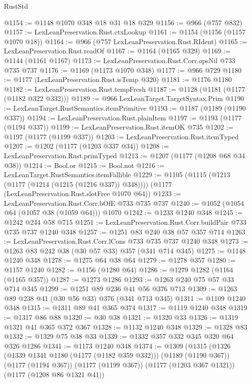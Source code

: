 \begin{lexlean}{RustStd}
\begin{coremodule}
{\begin{coremodule}
{{{{{@1154 := @1148 @1070 @348 @18 @31 @18 @329
@1156 := @966 (@757 @832)
@1157 := LexLeanPreservation.Rust.ctxLookup
@1161 := @1154 (@1156 (@1157 @1070 @18))
@1164 := @966 (@757 LexLeanPreservation.Rust.RIdent)
@1165 := LexLeanPreservation.Rust.readOf
@1167 := @1164 (@1165 @329)
@1169 := @1144 (@1161 @1167)
@1173 := LexLeanPreservation.Rust.Corr.opsNil @733 @735 @737
@1176 := @1169 (@1173 @1070 @348)
@1177 := @966 @729
@1180 := @1177 (LexLeanPreservation.Rust.isTemp @320)
@1181 := @1176 @1180
@1182 := LexLeanPreservation.Rust.tempFresh
@1187 := @1128 (@1181 (@1177 (@1182 @322 @332)))
@1189 := @966 LexLeanTarget.TargetSyntax.Prim
@1190 := LexLeanTarget.RustSemantics.itemPrimitive
@1193 := @1187 (@1189 (@1190 @337))
@1194 := LexLeanPreservation.Rust.plainItem
@1197 := @1193 (@1177 (@1194 @337))
@1199 := LexLeanPreservation.Rust.itemOK @735
@1202 := @1197 (@1177 (@1199 @337))
@1203 := LexLeanPreservation.Rust.itemTyped
@1207 := @1202 (@1177 (@1203 @337 @34))
@1208 := LexLeanPreservation.Rust.primTyped
@1213 := @1207 (@1177 (@1208 @68 @34 @38))
@1214 := Bool.or
@1215 := Bool.not
@1216 := LexLeanTarget.RustSemantics.itemFallible
@1229 := @1105
    (@1115 (@1213 (@1177 (@1214 (@1215 (@1216 @337)) @348))))
    (@1177 (LexLeanPreservation.Rust.slotFree @1070 @64))
@1233 := LexLeanPreservation.Rust.Corr.bOfE @733 @735 @737
@1240 := @1052 (@1054 @64 (@1057 @38 (@1059 @64))) @1070
@1242 := @1233 @1240 @348
@1245 := @1242 @244 @58 @715
@1251 := LexLeanPreservation.Rust.Corr.buildPair @733 @735 @737 @1240 @348
@1257 := @1251 @83 @240 @38 @57 @357 @714
@1263 := LexLeanPreservation.Rust.Corr.lCons @733 @735 @737 @1240 @348
@1273 := @1263 @83 @242 @38 (@30 @57 @33) @357 (@341 @714 @345)
@1275 := @1148 @1240 @348
@1278 := @1275 @64 @38 @64
@1279 := @1278 @357
@1280 := @1157 @1240
@1282 := @1156 (@1280 @64)
@1286 := @1279 @1282 (@1164 (@1165 @357))
@1287 := @1273 @1286
@1293 := @1263 @240 @75 @57 @33 @714 @345
@1299 := @1251 @89 @236 @41 @56 @376 @713
@1309 := @1263 @89 @238 @41 (@30 @56 @33) @376 (@341 @713 @345)
@1311 := @1109 @1240 @348
@1315 := @1311 @89 @41 @365 @374
@1317 := @1119 @1240 @348
@1319 := @1317 @86 @88
@1320 := @30 @38
@1321 := @1320 @33
@1326 := @1319 @1321 @41 @365 @372 @367
@1328 := @1132 @1240 @348
@1329 := @1328 @83
@1332 := @1329 @75 @38 @33
@1339 := @1332 @357 @332 @345 @320 @64 @326 @1286
@1341 := @1173 @1240 @348
@1374 := @1309
    (@1315
      (@1326
        (@1339 @1341 @1180 (@1177 (@1182 @359 @332)))
        (@1189 (@1190 @367))
        (@1177 (@1194 @367))
        (@1177 (@1199 @367))
        (@1177 (@1203 @367 @1321))
        (@1177 (@1208 @86 @1321 @41))
}}}}}
\end{coremodule}}
\end{coremodule}
\end{lexlean}
